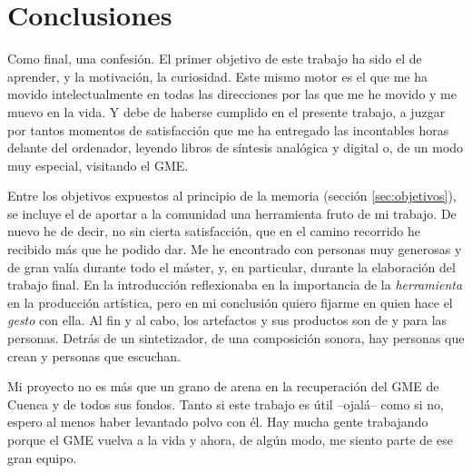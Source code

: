\chapter[Conclusiones]{Conclusiones}


Como final, una confesión. El primer objetivo de este trabajo ha sido el de aprender, y la motivación, la curiosidad. Este mismo motor es el que me ha movido intelectualmente en todas las direcciones por las que me he movido y me muevo en la vida. Y debe de haberse cumplido en el presente trabajo, a juzgar por tantos momentos de satisfacción que me ha entregado las incontables horas delante del ordenador, leyendo libros de síntesis analógica y digital o, de un modo muy especial, visitando el GME. 

Entre los objetivos expuestos al principio de la memoria (sección \ref{sec:objetivos}), se incluye el de aportar a la comunidad una herramienta fruto de mi trabajo. De nuevo he de decir, no sin cierta satisfacción, que en el camino recorrido he recibido más que he podido dar. Me he encontrado con personas muy generosas y de gran valía durante todo el máster, y, en particular, durante la elaboración del trabajo final. En la introducción reflexionaba en la importancia de la \textit{herramienta} en la producción artística, pero en mi conclusión quiero fijarme en quien hace el \textit{gesto} con ella. Al fin y al cabo, los artefactos y sus productos son de y para las personas. Detrás de un sintetizador, de una composición sonora, hay personas que crean y personas que escuchan.

Mi proyecto no es más que un grano de arena en la recuperación del GME de Cuenca y de todos sus fondos. Tanto si este trabajo es útil --ojalá-- como si no, espero al menos haber levantado polvo con él. Hay mucha gente trabajando porque el GME vuelva a la vida y ahora, de algún modo, me siento parte de ese gran equipo. 



